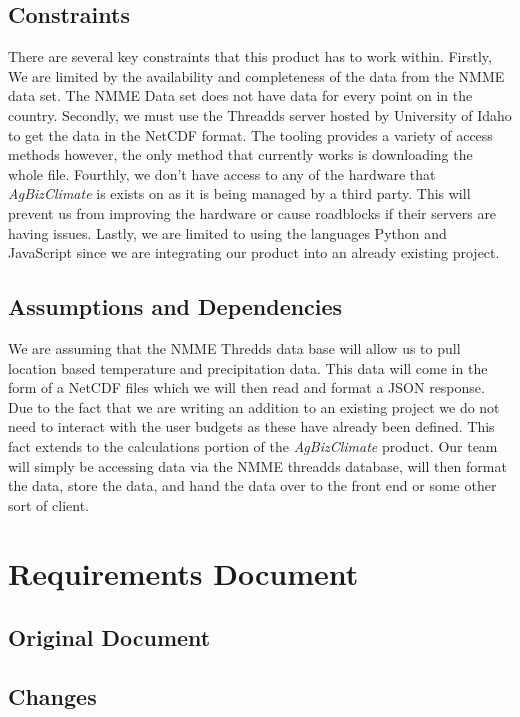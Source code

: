 \documentclass[onecolumn, draftclsnofoot,10pt, compsoc]{article}
\begin{document}
	\subsection{Constraints}
		There are several key constraints that this product has to work within. Firstly, We are limited by the availability and completeness of the data from the NMME data set. The NMME Data set does not have data for every point on in the country. Secondly, we must use the Threadds server hosted by University of Idaho to get the data in the NetCDF format. The tooling provides a variety of access methods however, the only method that currently works is downloading the whole file. Fourthly, we don’t have access to any of the hardware that \textit{AgBizClimate} is exists on as it is being managed by a third party. This will prevent us from improving the hardware or cause roadblocks if their servers are having issues. Lastly, we are limited to using the languages Python and JavaScript since we are integrating our product into an already existing project.\\

	\subsection {Assumptions and Dependencies}
		We are assuming that the NMME Thredds data base will allow us to pull location based temperature and precipitation data. This data will come in the form of a NetCDF files which we will then read and format a JSON response. Due to the fact that we are writing an addition to an existing project we do not need to interact with the user budgets as these have already been defined. This fact extends to the calculations portion of the \textit{AgBizClimate} product. Our team will simply be accessing data via the NMME threadds database, will then format the data, store the data, and hand the data over to the front end or some other sort of client.\\


\section{Requirements Document}
    \subsection{Original Document}
        
    
    \subsection{Changes}
    
\end{document}
